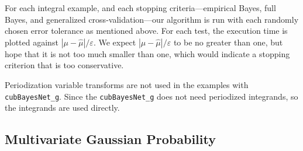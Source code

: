 \documentclass[graybox,footinfo]{svmult}
\newcommand{\hmu}{\widehat{\mu}}
\newcommand{\code}[1]{\texttt{#1}}
\def\abs#1{\ensuremath{\left \lvert #1 \right \rvert}}
\newcommand\secref{Section~\ref}
\begin{document}
For each integral example, and each stopping criteria---empirical Bayes, full Bayes, and generalized cross-validation---our algorithm is run with each randomly chosen error tolerance as mentioned above.  For each test, the execution time is plotted against $\abs{\mu - \hmu}/\varepsilon$.  We expect $\abs{\mu - \hmu}/\varepsilon$ to be no greater than one, but hope that it is not too much smaller than one, which would indicate a stopping criterion that is too conservative.


Periodization variable transforms are not used in the examples with \\ \allowbreak \code{cubBayesNet\_g}. Since the \allowbreak \code{cubBayesNet\_g} does not need periodized integrands, so the integrands are used directly.



\subsection{Multivariate Gaussian Probability}
\end{document}
